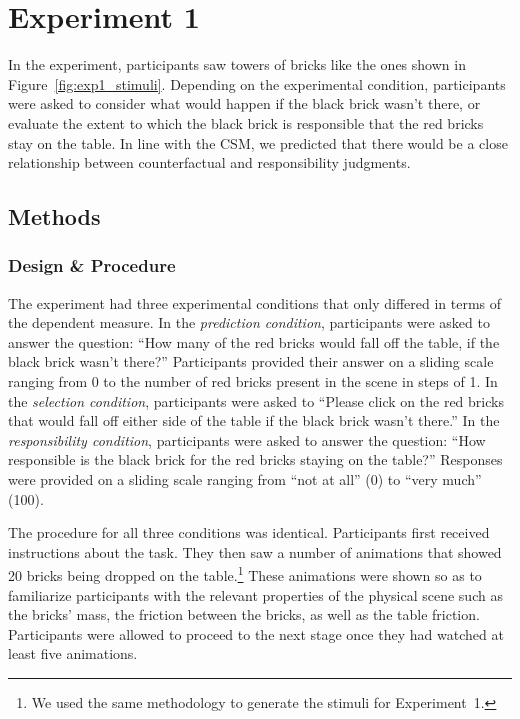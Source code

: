 \documentclass[10pt, letterpaper]{article}
\begin{document}
\section{Experiment 1}
\label{sec:experiment_1}

In the experiment, participants saw towers of bricks like the ones shown in Figure~\ref{fig:exp1_stimuli}. Depending on the experimental condition, participants were asked to consider what would happen if the black brick wasn't there, or evaluate the extent to which the black brick is responsible that the red bricks stay on the table. In line with the CSM, we predicted that there would be a close relationship between counterfactual and responsibility judgments. 

\subsection{Methods}
\label{sub:methods}

\subsubsection{Design \& Procedure}

The experiment had three experimental conditions that only differed in terms of the dependent measure. In the \emph{prediction condition}, participants were asked to answer the question: ``How many of the red bricks would fall off the table, if the black brick wasn't there?'' Participants provided their answer on a sliding scale ranging from 0 to the number of red bricks present in the scene in steps of 1. In the \emph{selection condition}, participants were asked to ``Please click on the red bricks that would fall off either side of the table if the black brick wasn't there.'' In the \emph{responsibility condition}, participants were asked to answer the question: ``How responsible is the black brick for the red bricks staying on the table?'' Responses were provided on a sliding scale ranging from ``not at all'' (0) to ``very much'' (100). 

The procedure for all three conditions was identical. Participants first received instructions about the task. They then saw a number of animations that showed 20 bricks being dropped on the table.\footnote{We used the same methodology to generate the stimuli for Experiment~1.} These animations were shown so as to familiarize participants with the relevant properties of the physical scene such as the bricks' mass, the friction between the bricks, as well as the table friction. Participants were allowed to proceed to the next stage once they had watched at least five animations. 
\end{document}
